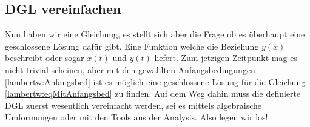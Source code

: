 \subsection{DGL vereinfachen
	\label{lambertw:subsection:DGLvereinfach}}
Nun haben wir eine Gleichung, es stellt sich aber die Frage ob es überhaupt eine geschlossene Lösung dafür gibt. Eine Funktion welche die Beziehung \(y(x)\) beschreibt oder sogar \(x(t)\) und \(y(t)\) liefert. Zum jetzigen Zeitpunkt mag es nicht trivial scheinen, aber mit den gewählten Anfangsbedingungen \eqref{lambertw:Anfangsbed} ist es möglich eine geschlossene Lösung für die Gleichung \eqref{lambertw:eqMitAnfangsbed} zu finden.
Auf dem Weg dahin muss die definierte DGL zuerst wesentlich vereinfacht werden, sei es mittels algebraische Umformungen oder mit den Tools aus der Analysis. Also legen wir los! 

